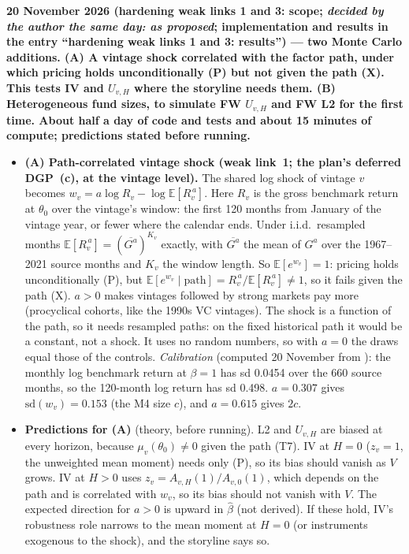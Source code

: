 \documentclass[11pt]{article}
\newcommand{\E}{\mathbb{E}}
\newcommand{\file}[1]{\path{#1}}
\begin{document}
\textbf{20 November 2026 (hardening weak links 1 and 3: scope; \emph{decided by the author the same day: as proposed}; implementation and results in the entry ``hardening weak links 1 and 3: results'') --- two Monte Carlo additions. (A) A vintage shock correlated with the factor path, under which pricing holds unconditionally (P) but not given the path (X). This tests IV and $U_{v,H}$ where the storyline needs them. (B) Heterogeneous fund sizes, to simulate FW $U_{v,H}$ and FW L2 for the first time. About half a day of code and tests and about 15 minutes of compute; predictions stated before running.}
\begin{itemize}
\item \textbf{(A) Path-correlated vintage shock (weak link~1; the plan's deferred DGP~(c), at the vintage level).} The shared log shock of vintage $v$ becomes $w_v=a\log R_v-\log\E[R_v^{\,a}]$. Here $R_v$ is the gross benchmark return at $\theta_0$ over the vintage's window: the first 120 months from January of the vintage year, or fewer where the calendar ends. Under i.i.d.\ resampled months $\E[R_v^{\,a}]=(\overline{G^a})^{K_v}$ exactly, with $\overline{G^a}$ the mean of $G^a$ over the 1967--2021 source months and $K_v$ the window length. So $\E[e^{w_v}]=1$: pricing holds unconditionally (P), but $\E[e^{w_v}\mid\text{path}]=R_v^{\,a}/\E[R_v^{\,a}]\neq1$, so it fails given the path (X). $a>0$ makes vintages followed by strong markets pay more (procyclical cohorts, like the 1990s VC vintages). The shock is a function of the path, so it needs resampled paths: on the fixed historical path it would be a constant, not a shock. It uses no random numbers, so with $a=0$ the draws equal those of the controls. \emph{Calibration} (computed 20 November from \file{empirical/data_prepared_2026/q_factors.csv}): the monthly log benchmark return at $\beta=1$ has sd 0.0454 over the 660 source months, so the 120-month log return has sd 0.498. $a=0.307$ gives $\mathrm{sd}(w_v)=0.153$ (the M4 size $c$), and $a=0.615$ gives $2c$.
\item \textbf{Predictions for (A)} (theory, before running). L2 and $U_{v,H}$ are biased at every horizon, because $\mu_v(\theta_0)\neq0$ given the path (T7). IV at $H=0$ ($z_v=1$, the unweighted mean moment) needs only (P), so its bias should vanish as $V$ grows. IV at $H>0$ uses $z_v=A_{v,H}(1)/A_{v,0}(1)$, which depends on the path and is correlated with $w_v$, so its bias should not vanish with $V$. The expected direction for $a>0$ is upward in $\hat\beta$ (not derived). If these hold, IV's robustness role narrows to the mean moment at $H=0$ (or instruments exogenous to the shock), and the storyline says so.

\end{itemize}
\end{document}
